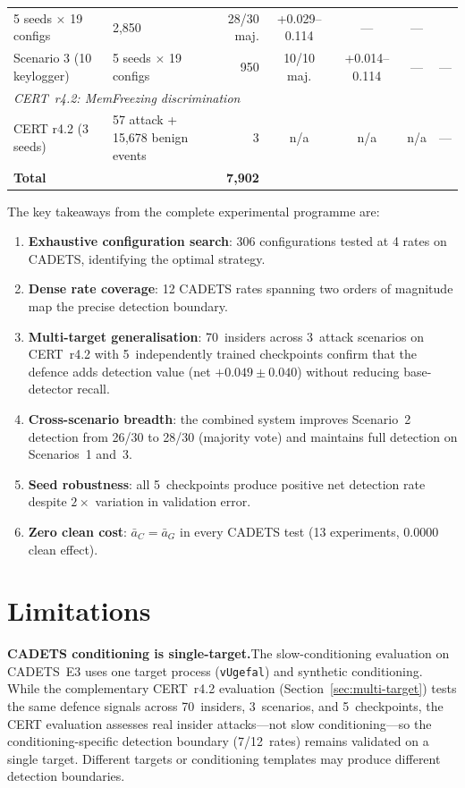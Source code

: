 \documentclass[10pt,twocolumn]{article}
\begin{document}
\begin{table}[!t]
{\begin{tabular}{llrcccc}
  5 seeds $\times$ 19 configs & 2,850 &
  28/30 maj. & +0.029--0.114 & --- & --- \\
\quad Scenario 3 (10 keylogger) &
  5 seeds $\times$ 19 configs & 950 &
  10/10 maj. & +0.014--0.114 & --- & --- \\
\midrule
\multicolumn{7}{l}{\emph{CERT~r4.2: MemFreezing discrimination}} \\
\quad CERT r4.2 (3 seeds) &
  57 attack + 15,678 benign events & 3 &
  n/a & n/a & n/a & --- \\
\midrule
\textbf{Total} & & \textbf{7,902} & & & & \\
\bottomrule
\end{tabular}}
\end{table}

The key takeaways from the complete experimental programme are:
\begin{enumerate}
  \item \textbf{Exhaustive configuration search}: 306 configurations tested
    at 4 rates on CADETS, identifying the optimal strategy.
  \item \textbf{Dense rate coverage}: 12 CADETS rates spanning two orders of
    magnitude map the precise detection boundary.
  \item \textbf{Multi-target generalisation}: 70~insiders across 3~attack
    scenarios on CERT~r4.2 with 5~independently trained checkpoints confirm
    that the defence adds detection value (net $+0.049 \pm 0.040$) without
    reducing base-detector recall.
  \item \textbf{Cross-scenario breadth}: the combined system improves
    Scenario~2 detection from 26/30 to 28/30 (majority vote) and maintains
    full detection on Scenarios~1 and~3.
  \item \textbf{Seed robustness}: all 5~checkpoints produce positive
    net detection rate despite $2\times$ variation in validation error.
  \item \textbf{Zero clean cost}: $\bar{a}_C = \bar{a}_G$ in every
    CADETS test (13 experiments, 0.0000 clean effect).
\end{enumerate}

\section{Limitations}
\label{sec:limitations}

\textbf{CADETS conditioning is single-target.}\quad The slow-conditioning
evaluation on CADETS~E3 uses one target process (\texttt{vUgefal}) and
synthetic conditioning.  While the complementary CERT~r4.2 evaluation
(Section~\ref{sec:multi-target}) tests the same defence signals across
70~insiders, 3~scenarios, and 5~checkpoints, the CERT evaluation assesses
real insider attacks---not slow conditioning---so the conditioning-specific
detection boundary (7/12~rates) remains validated on a single target.
Different targets or conditioning templates may produce different
detection boundaries.
\end{document}
